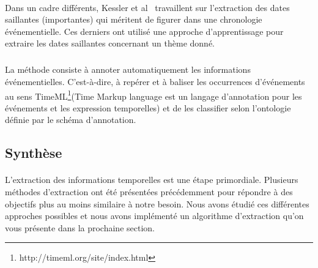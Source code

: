 \documentclass[12pt,a4]{report}
\begin{document}
\paragraph{}
Dans un cadre différents, Kessler et al~\cite{kessler2013} travaillent sur l'extraction des dates saillantes (importantes) qui méritent de figurer dans une chronologie événementielle.
Ces derniers ont utilisé une approche d’apprentissage pour extraire les dates saillantes concernant un thème donné.
\subparagraph{}
La méthode consiste à annoter automatiquement les informations événementielles. C’est-à-dire, à  repérer et à baliser les occurrences d’événements au sens TimeML\footnote{http://timeml.org/site/index.html}(Time Markup language est un langage d'annotation pour les événements et les expression temporelles) et de les classifier selon l’ontologie définie par le schéma d’annotation.
\subsection{Synthèse}
\paragraph{}
L'extraction des informations temporelles est une étape primordiale. Plusieurs méthodes d'extraction ont été présentées précédemment pour répondre à des objectifs plus au moins similaire à notre besoin. Nous avons étudié ces différentes approches possibles et nous avons implémenté un algorithme d'extraction qu'on vous présente dans la prochaine section.


\printglossary[title=Glossaire]
\end{document}
